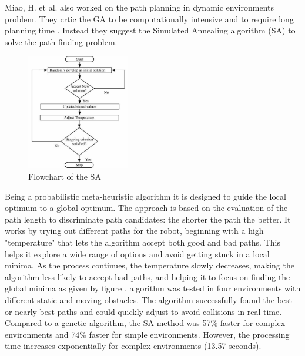 Miao, H. et al. also worked on the path planning in dynamic environments problem. They crtic the GA to be computationally
intensive and to require long planning time \cite{R40}. Instead they suggest the Simulated Annealing algorithm (SA)
to solve the path finding problem. 
\newpage 
\begin{figure}
    \centering
    \includegraphics[width=0.4\textwidth]{images/Chap1/SA.jpg}
    \caption{Flowchart of the SA \cite{R41}}
    \label{SA}
\end{figure}

Being a probabilistic meta-heuristic algorithm it is designed to guide the local
optimum to a global optimum. The approach is based on the evaluation of the path length to discriminate 
path candidates: the shorter the path the better. It works by trying out different paths for the robot, beginning 
with a high "temperature" that lets the algorithm accept both good and bad paths. This helps it explore a wide range of 
options and avoid getting stuck in a local minima. As the process continues, the temperature slowly decreases, 
making the algorithm less likely to accept bad paths, and helping it to focus on finding the global minima as given by 
figure . algorithm was tested in four environments with different static and moving obstacles. The algorithm 
successfully found the best or nearly best paths and could quickly adjust to avoid collisions in real-time. 
Compared to a genetic algorithm, the SA method was 57\% faster for complex environments and 74\% faster for simple
environments. However, the processing time increases exponentially for complex environments (13.57 seconds).


